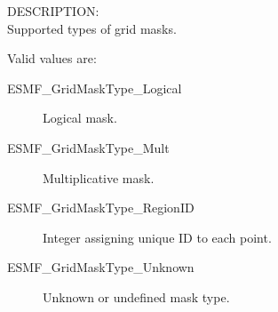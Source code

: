 {\sf DESCRIPTION:\\}
Supported types of grid masks.

Valid values are:
\begin{description}
   \item [ESMF\_GridMaskType\_Logical]
         Logical mask.
   \item [ESMF\_GridMaskType\_Mult]
         Multiplicative mask.
   \item [ESMF\_GridMaskType\_RegionID]
         Integer assigning unique ID to each point.
   \item [ESMF\_GridMaskType\_Unknown]
         Unknown or undefined mask type.
\end{description}

